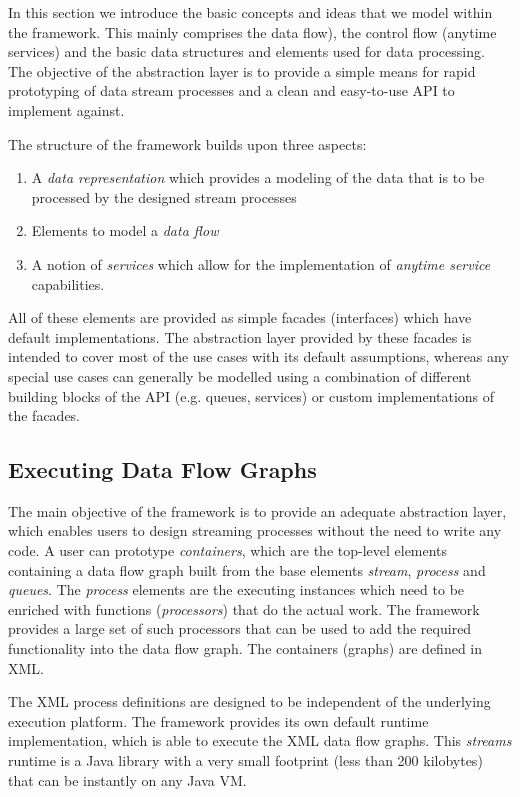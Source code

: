 In this section we introduce the basic concepts and ideas that we
model within the \streams framework. This mainly comprises the data
flow), the control flow (anytime services) and the basic data
structures and elements used for data processing. The objective of the
abstraction layer is to provide a simple means for rapid prototyping
of data stream processes and a clean and easy-to-use API to implement
against.

The structure of the \streams framework builds upon three aspects:
\begin{enumerate}
\item A {\em data representation} which provides a modeling of the
  data that is to be processed by the designed stream processes
\item Elements to model a {\em data flow}
\item A notion of {\em services} which allow for the implementation
  of {\em anytime service} capabilities.
\end{enumerate}
All of these elements are provided as simple facades (interfaces)
which have default implementations. The abstraction layer provided by
these facades is intended to cover most of the use cases with its
default assumptions, whereas any special use cases can generally be
modelled using a combination of different building blocks of the API
(e.g. queues, services) or custom implementations of the facades.

\subsection*{\label{sec:xmlToRuntime}Executing Data Flow Graphs}
The main objective of the \streams framework is to provide an adequate
abstraction layer, which enables users to design streaming processes
without the need to write any code. A user can prototype {\em
  containers}, which are the top-level elements containing a data flow
graph built from the base elements {\em stream}, {\em process} and
{\em queues}. The {\em process} elements are the executing instances
which need to be enriched with functions ({\em processors}) that do
the actual work. The framework provides a large set of such processors
that can be used to add the required functionality into the data flow
graph. The containers (graphs) are defined in XML.

The XML process definitions are designed to be independent of the
underlying execution platform. The \streams framework provides its own
default runtime implementation, which is able to execute the XML data
flow graphs. This {\em streams} runtime is a Java library with a very
small footprint (less than 200 kilobytes) that can be instantly on any
Java VM.


